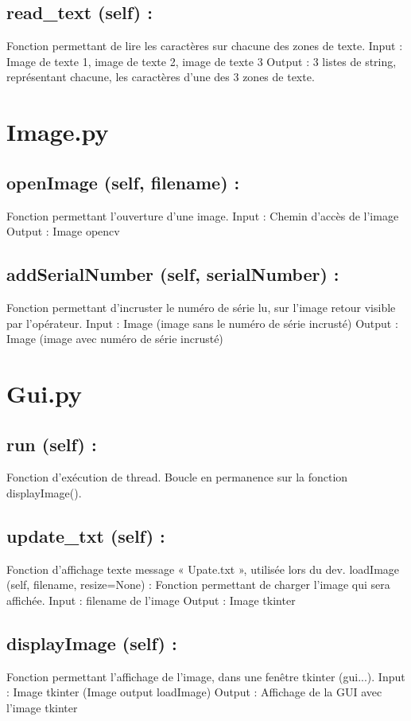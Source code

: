\subsection{read_text (self) :}
Fonction permettant de lire les caractères sur chacune des zones de texte.
Input : Image de texte 1, image de texte 2, image de texte 3
Output : 3 listes de string, représentant chacune, les caractères d’une des 3 zones de texte.

\section{Image.py}
\subsection{openImage (self, filename) :}
Fonction permettant l’ouverture d’une image.
Input : Chemin d’accès de l’image
Output : Image opencv

\subsection{addSerialNumber (self, serialNumber) :}
Fonction permettant d’incruster le numéro de série lu, sur l’image retour visible par l’opérateur.
Input : Image (image sans le numéro de série incrusté)
Output : Image (image avec numéro de série incrusté)

\section{Gui.py}
\subsection{run (self) :}
Fonction d’exécution de thread. Boucle en permanence sur la fonction displayImage().

\subsection{update_txt (self) :}
Fonction d’affichage texte message « Upate.txt », utilisée lors du dev.
loadImage (self, filename, resize=None) :
Fonction permettant de charger l’image qui sera affichée.
Input : filename de l’image
Output : Image tkinter

\subsection{displayImage (self) :}
Fonction permettant l’affichage de l’image, dans une fenêtre tkinter (gui...).
Input : Image tkinter (Image output loadImage)
Output : Affichage de la GUI avec l’image tkinter

